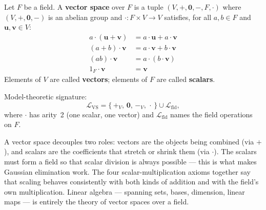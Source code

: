 \begin{definition}
\label{def:formal-model-theoretic-structures-l784}
  Let $F$ be a field.  A \textbf{vector space} over $F$ is a tuple
  $(V, +, \mathbf{0}, -, F, \cdot)$ where $(V, +, \mathbf{0}, -)$ is an
  abelian group and $\cdot : F \times V \to V$ satisfies, for all $a, b \in F$
  and $\mathbf{u}, \mathbf{v} \in V$:
  \begin{align*}
    a \cdot (\mathbf{u} + \mathbf{v}) &= a\cdot\mathbf{u} + a\cdot\mathbf{v}
      \tag{Distributivity over vector $+$}\\
    (a + b)\cdot\mathbf{v} &= a\cdot\mathbf{v} + b\cdot\mathbf{v}
      \tag{Distributivity over scalar $+$}\\
    (ab)\cdot\mathbf{v} &= a\cdot(b\cdot\mathbf{v})
      \tag{Compatibility}\\
    1_F\cdot\mathbf{v} &= \mathbf{v}
      \tag{Identity scalar}
  \end{align*}
  Elements of $V$ are called \textbf{vectors}; elements of $F$ are called
  \textbf{scalars}.

  \medskip\noindent
  Model-theoretic signature:
  \[
    \mathcal{L}_{\mathrm{VS}} = \{\,+_V,\,\mathbf{0},\,-_V,\,\cdot\,\}
    \cup \mathcal{L}_{\mathrm{fld}},
  \]
  where $\cdot$ has arity~2 (one scalar, one vector) and
  $\mathcal{L}_{\mathrm{fld}}$ names the field operations on $F$.
\end{definition}

\begin{remark}
  A vector space decouples two roles: vectors are the objects being combined
  (via $+$), and scalars are the coefficients that stretch or shrink them
  (via $\cdot$).  The scalars must form a field so that scalar division is
  always possible --- this is what makes Gaussian elimination work.  The four
  scalar-multiplication axioms together say that scaling behaves consistently
  with both kinds of addition and with the field's own multiplication.  Linear
  algebra --- spanning sets, bases, dimension, linear maps --- is entirely the
  theory of vector spaces over a field.
\end{remark}

